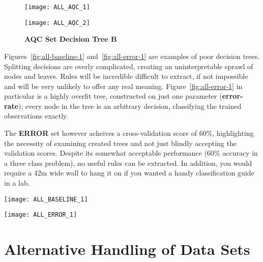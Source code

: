 \begin{figure}[htbp!]
    \centering
    \texttt{[image: ALL\_AQC\_1]}
    \caption[all-aqc-1]{\textbf{AQC Set Decision Tree A}}
    \label{fig:all-aqc-1}

    \vspace{20mm}

    \texttt{[image: ALL\_AQC\_2]}
    \caption[all-aqc-1]{\textbf{AQC Set Decision Tree B}}
    \label{fig:all-aqc-2}
\end{figure}


Figures~\ref{fig:all-baseline-1} and~\ref{fig:all-error-1} are examples of
poor decision trees. Splitting decisions are overly complicated, creating an
uninterpretable sprawl of nodes and leaves. Rules will be incredible difficult
to extract, if not impossible and will be very unlikely to offer any real
meaning. Figure~\ref{fig:all-error-1} in particular is a highly overfit tree,
constructed on just one parameter (\textbf{error-rate}); every node in the tree
is an arbitrary decision, classifying the trained observations exactly.

The \textbf{ERROR} set however acheives a cross-validation score of 60\%,
highlighting the necessity of examining created trees and not just blindly
accepting the validation scores. Despite its somewhat acceptable performance
(60\% accuracy in a three class problem), no
useful rules can be extracted. In addition, you would require a 42m wide
wall to hang it on if you wanted a handy classification guide in a lab.


\begin{sidewaysfigure}[htbp!]
    \centering
    \texttt{[image: ALL\_BASELINE\_1]}
    \caption[all-baseline-1]{\textbf{BASELINE Set Decision Tree}: A
    decision tree trained using the \textbf{BASELINE} set.}
    \label{fig:all-baseline-1}

    \vspace{20mm}

    \texttt{[image: ALL\_ERROR\_1]}
    \caption[all-error-1]{\textbf{ERROR Set Decision Tree}: A highly
        overfit decision tree trained on the single parameter \textbf{ERROR}
    set.}
    \label{fig:all-error-1}
\end{sidewaysfigure}


\section{Alternative Handling of Data Sets}

